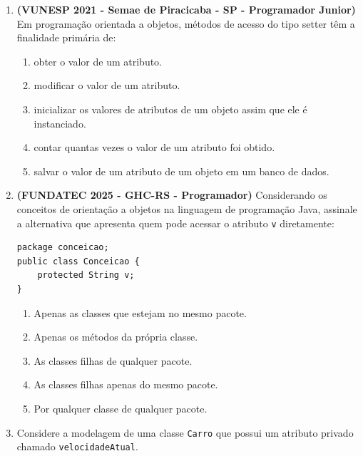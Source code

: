 \documentclass[12pt,a4paper]{article}
\begin{document}
\begin{enumerate}
    \item \textbf{(VUNESP 2021 - Semae de Piracicaba - SP - Programador Junior)} Em programação orientada a objetos, métodos de acesso do tipo setter têm a finalidade primária de:
    \begin{enumerate}[label=\Alph*)]
        \item obter o valor de um atributo.
        \item modificar o valor de um atributo.
        \item inicializar os valores de atributos de um objeto assim que ele é instanciado.
        \item contar quantas vezes o valor de um atributo foi obtido.
        \item salvar o valor de um atributo de um objeto em um banco de dados.
    \end{enumerate}

    \item \textbf{(FUNDATEC 2025 - GHC-RS - Programador)} Considerando os conceitos de orientação a objetos na linguagem de programação Java, assinale a alternativa que apresenta quem pode acessar o atributo \texttt{v} diretamente:

\begin{lstlisting}
package conceicao; 
public class Conceicao {       
    protected String v; 
}
\end{lstlisting}

    \begin{enumerate}[label=\Alph*)]
        \item Apenas as classes que estejam no mesmo pacote.
        \item Apenas os métodos da própria classe.
        \item As classes filhas de qualquer pacote.
        \item As classes filhas apenas do mesmo pacote.
        \item Por qualquer classe de qualquer pacote.
    \end{enumerate}

    \item Considere a modelagem de uma classe \texttt{Carro} que possui um atributo privado chamado \texttt{velocidadeAtual}. 

    \begin{center}
\end{center}
\end{enumerate}
\end{document}
